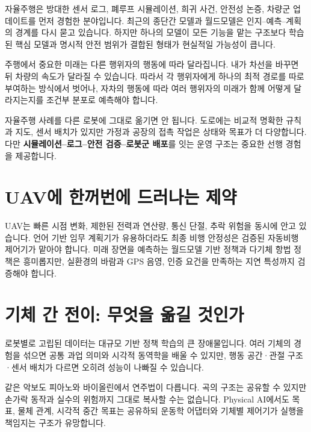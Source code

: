 \documentclass[11pt,openany]{book}
\begin{document}
자율주행은 방대한 센서 로그, 폐루프 시뮬레이션, 희귀 사건, 안전성 논증, 차량군 업데이트를 먼저 경험한 분야입니다. 최근의 종단간 모델과 월드모델은 인지--예측--계획의 경계를 다시 묻고 있습니다. 하지만 하나의 모델이 모든 기능을 맡는 구조보다 학습된 핵심 모델과 명시적 안전 범위가 결합된 형태가 현실적일 가능성이 큽니다.

주행에서 중요한 미래는 다른 행위자의 행동에 따라 달라집니다. 내가 차선을 바꾸면 뒤 차량의 속도가 달라질 수 있습니다. 따라서 각 행위자에게 하나의 최적 경로를 따로 부여하는 방식에서 벗어나, 자차의 행동에 따라 여러 행위자의 미래가 함께 어떻게 달라지는지를 조건부 분포로 예측해야 합니다.

\begin{profbox}
자율주행 사례를 다른 로봇에 그대로 옮기면 안 됩니다. 도로에는 비교적 명확한 규칙과 지도, 센서 배치가 있지만 가정과 공장의 접촉 작업은 상태와 목표가 더 다양합니다. 다만 \textbf{시뮬레이션--로그--안전 검증--로봇군 배포}를 잇는 운영 구조는 중요한 선행 경험을 제공합니다.
\end{profbox}

\section{UAV에 한꺼번에 드러나는 제약}

UAV는 빠른 시점 변화, 제한된 전력과 연산량, 통신 단절, 추락 위험을 동시에 안고 있습니다. 언어 기반 임무 계획기가 유용하더라도 최종 비행 안정성은 검증된 자동비행 제어기가 맡아야 합니다. 미래 장면을 예측하는 월드모델 기반 정책과 다기체 항법 정책은 흥미롭지만, 실환경의 바람과 GPS 음영, 인증 요건을 만족하는 지연 특성까지 검증해야 합니다.

\section{기체 간 전이: 무엇을 옮길 것인가}

로봇별로 고립된 데이터는 대규모 기반 정책 학습의 큰 장애물입니다. 여러 기체의 경험을 섞으면 공통 과업 의미와 시각적 동역학을 배울 수 있지만, 행동 공간·관절 구조·센서 배치가 다르면 오히려 성능이 나빠질 수 있습니다.

같은 악보도 피아노와 바이올린에서 연주법이 다릅니다. 곡의 구조는 공유할 수 있지만 손가락 동작과 실수의 위험까지 그대로 복사할 수는 없습니다. Physical AI에서도 목표, 물체 관계, 시각적 중간 목표는 공유하되 운동학 어댑터와 기체별 제어기가 실행을 책임지는 구조가 유망합니다.
\end{document}
